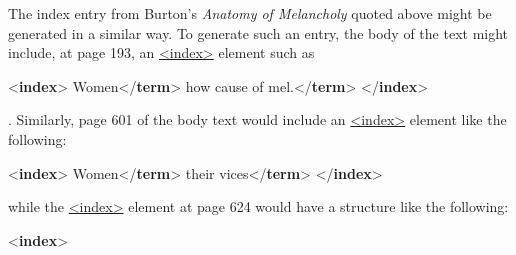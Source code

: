 The index entry from Burton's \textit{Anatomy of Melancholy} quoted above might be generated in a similar way. To generate such an entry, the body of the text might include, at page 193, an \hyperref[TEI.index]{<index>} element such as \par\bgroup{}\exampleFont \begin{shaded}\noindent\mbox{}{<\textbf{index}>}\mbox{}\newline 
{}Women{</\textbf{term}>}\mbox{}\newline 
{}\mbox{}\newline 
\hspace*{1em}how cause of mel.{</\textbf{term}>}\mbox{}\newline 
{}\mbox{}\newline 
{</\textbf{index}>}\end{shaded}\egroup\par \noindent . Similarly, page 601 of the body text would include an \hyperref[TEI.index]{<index>} element like the following: \par\bgroup{}\exampleFont \begin{shaded}\noindent\mbox{}{<\textbf{index}>}\mbox{}\newline 
{}Women{</\textbf{term}>}\mbox{}\newline 
{}\mbox{}\newline 
\hspace*{1em}their vices{</\textbf{term}>}\mbox{}\newline 
{}\mbox{}\newline 
{</\textbf{index}>}\end{shaded}\egroup\par \noindent  while the \hyperref[TEI.index]{<index>} element at page 624 would have a structure like the following: \par\bgroup{}\exampleFont \begin{shaded}\noindent\mbox{}{<\textbf{index}>}\mbox{}\newline 

\end{shaded}
